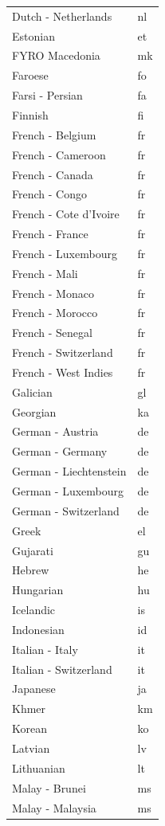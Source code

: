 \documentclass[
  12pt,
]{krantz}
\begin{document}
\begin{longtable}[t]{ll}
\addlinespace
Dutch - Netherlands & nl\\
Estonian & et\\
FYRO Macedonia & mk\\
Faroese & fo\\
Farsi - Persian & fa\\
\addlinespace
Finnish & fi\\
French - Belgium & fr\\
French - Cameroon & fr\\
French - Canada & fr\\
French - Congo & fr\\
\addlinespace
French - Cote d'Ivoire & fr\\
French - France & fr\\
French - Luxembourg & fr\\
French - Mali & fr\\
French - Monaco & fr\\
\addlinespace
French - Morocco & fr\\
French - Senegal & fr\\
French - Switzerland & fr\\
French - West Indies & fr\\
Galician & gl\\
\addlinespace
Georgian & ka\\
German - Austria & de\\
German - Germany & de\\
German - Liechtenstein & de\\
German - Luxembourg & de\\
\addlinespace
German - Switzerland & de\\
Greek & el\\
Gujarati & gu\\
Hebrew & he\\
Hungarian & hu\\
\addlinespace
Icelandic & is\\
Indonesian & id\\
Italian - Italy & it\\
Italian - Switzerland & it\\
Japanese & ja\\
\addlinespace
Khmer & km\\
Korean & ko\\
Latvian & lv\\
Lithuanian & lt\\
Malay - Brunei & ms\\
\addlinespace
Malay - Malaysia & ms\\

\end{longtable}
\end{document}
